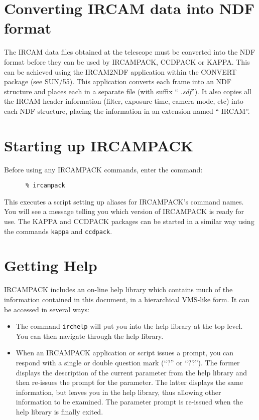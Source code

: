 \section{Converting IRCAM data into NDF format}

The {\small IRCAM} data files obtained at the telescope must be
converted into the {\small NDF} format before they can be used by
{\small IRCAMPACK, CCDPACK} or {\small KAPPA}. This can be achieved
using the {\small IRCAM2NDF} application within the {\small CONVERT}
package (see SUN/55). This application converts each frame into an NDF
structure and places each in a separate file (with suffix ``{\em
.sdf}''). It also copies all the {\small IRCAM} header information
(filter, exposure time, camera mode, etc) into each {\small NDF}
structure, placing the information in an extension named ``{\small
IRCAM}''.

\section{Starting up IRCAMPACK}

Before using any {\small IRCAMPACK} commands, enter the command:

\small
\begin{verbatim}
      % ircampack
\end{verbatim}
\normalsize

This executes a script setting up aliases for {\small IRCAMPACK}'s
command names. You will see a message telling you which version of
{\small IRCAMPACK} is ready for use. The {\small KAPPA} and {\small
CCDPACK} packages can be started in a similar way using the commands
\verb+kappa+ and \verb+ccdpack+.

\section{Getting Help}

{\small IRCAMPACK} includes an on-line help library which contains much
of the information contained in this document, in a hierarchical
VMS-like form. It can be accessed in several ways:

\begin {itemize} 

\item The command \verb+irchelp+ will put you into the help library at
the top level. You can then navigate through the help library.

\item When an {\small IRCAMPACK} application or script issues a prompt,
you can respond with a single or double question mark (``?'' or
``??''). The former displays the description of the current parameter
from the help library and then re-issues the prompt for the parameter.
The latter displays the same information, but leaves you in the help
library, thus allowing other information to be examined. The parameter
prompt is re-issued when the help library is finally exited.

\end{itemize}

